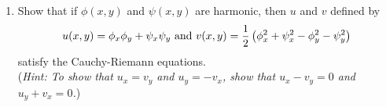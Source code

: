 \begin{enumerate}
\begin{enumerate}
\begin{proof}
    Because $u$ and $v$ are harmonic, we know that:
    \begin{align*}
      \prt{^2u}{x^2}+\prt{^2u}{y^2} &= 0\\
      \prt{^2v}{y^2}+\prt{v}{y^2}&=0, \text{ so it follows that:}\\
       \prt{^2u}{x^2}+\prt{^2u}{y^2}+ \prt{^2v}{y^2}+\prt{v}{y^2} = 0
    \end{align*}
    \end{proof}
		\item The product $uv$ is harmonic in $D$.
		\begin{problem}
			This statement is not true. Consider the two harmonic functions $u = x$ and $v = x$. We have for both of these that all second order partials are continuous:
			\begin{align*}
				\prtt{v}{x} = 0, \quad\prtt{u}{y} = 0, \quad\prt{^2v}{xy} = 0
			\end{align*}
			Trivially, they satisfy Laplace's equations. 
			However, consider that $uv = x^2$. If we take the second order partials of $uv$, we have that:
			\begin{align*}
				\prtt{uv}{x} = 2&, \quad \prtt{uv}{y} = 0\\
				\prtt{uv}{x} + \prtt{uv}y &\ne 0 
			\end{align*}
			Thus, if two functions are harmonic, this does not imply that their product is harmonic. 
		\end{problem}
	\end{enumerate}

\item Show that if $\phi(x,y)$ and $\psi(x,y)$ are harmonic, then $u$ and $v$ defined by
	\[u(x,y) = \phi_x \phi_y +\psi_x \psi_y \text{ and } v(x,y) = \frac{1}{2} \left( \phi_x^2 +\psi_x^2 -\phi_y^2 -\psi_y^2 \right) \]
	satisfy the Cauchy-Riemann equations.\\
	({\it Hint: To show that $u_x = v_y$ and $u_y = -v_x$, show that $u_x -v_y =0$ and $u_y +v_x =0$.})


\end{enumerate}
